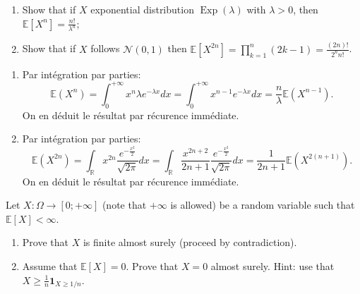 \begin{Exercise}
  \begin{enumerate}
    \item Show that if $X$ exponential distribution $\operatorname{Exp}(\lambda)$ with $\lambda>0$, then $\mathbb{E}\left[X^{n}\right]=\frac{n !}{\lambda^{n}}$;

    \item Show that if $X$ follows $\mathcal{N}(0,1)$ then $\mathbb{E}\left[X^{2 n}\right]=\prod_{k=1}^{n}(2 k-1)=\frac{(2 n) !}{2^{n} n !}$.

  \end{enumerate}
\end{Exercise}

\begin{solution}
  \begin{enumerate}
    \item Par int\'{e}gration par parties:
          \[
            \mathbb{E}\left(X^{n}\right) = \int_{0}^{+\infty}x^{n}\lambda e^{-\lambda x}dx = \int_{0}^{+\infty}x^{n-1} e^{-\lambda x}dx = \frac{n}{\lambda}\mathbb{E}\left(X^{n-1}\right).
          \]
          On en d\'{e}duit le r\'{e}sultat par r\'{e}curence imm\'{e}diate.
    \item Par int\'{e}gration par parties:
          \[
            \mathbb{E}\left(X^{2n}\right) = \int_{\mathbb{R}}x^{2n}\frac{e^{-\frac{x^2}{2}}}{\sqrt{2\pi}}dx = \int_{\mathbb{R}}\frac{x^{2n+2}}{2n + 1}\frac{e^{-\frac{x^2}{2}}}{\sqrt{2\pi}}dx = \frac{1}{2n+1}\mathbb{E}\left(X^{2(n+1)}\right).
          \]
          On en d\'{e}duit le r\'{e}sultat par r\'{e}curence imm\'{e}diate.
  \end{enumerate}
\end{solution}

\begin{Exercise}
  Let $X: \Omega \rightarrow[0 ;+\infty]$ (note that $+\infty$ is allowed) be a random variable such that $\mathbb{E}[X]<\infty$.

  \begin{enumerate}
    \item Prove that $X$ is finite almost surely (proceed by contradiction).

    \item Assume that $\mathbb{E}[X]=0$. Prove that $X=0$ almost surely. Hint: use that $X \geq \frac{1}{n} \mathbf{1}_{X \geq 1 / n}$.
  \end{enumerate}
\end{Exercise}

